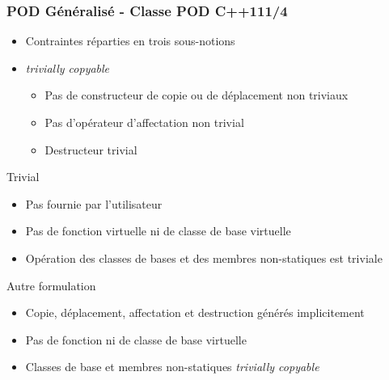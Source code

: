 \documentclass[C++.tex]{subfiles}
\begin{document}
\begin{frame}[fragile]
	\frametitle{POD Généralisé - Classe POD C++11\titlehfill{}1/4}
	\begin{itemize}
		\item Contraintes réparties en trois sous-notions
		\item \textit{trivially copyable}
		\begin{itemize}
			\item Pas de constructeur de copie ou de déplacement non triviaux
			\item Pas d'opérateur d'affectation non trivial
			\item Destructeur trivial
		\end{itemize}
	\end{itemize}

	\pause

	\begin{block}{Trivial}
		\begin{itemize}
			\item Pas fournie par l'utilisateur
			\item Pas de fonction virtuelle ni de classe de base virtuelle
			\item Opération des classes de bases et des membres non-statiques est triviale
		\end{itemize}
	\end{block}

	\pause

	\begin{block}{Autre formulation}
		\begin{itemize}
			\item Copie, déplacement, affectation et destruction générés implicitement
			\item Pas de fonction ni de classe de base virtuelle
			\item Classes de base et membres non-statiques \textit{trivially copyable}
		\end{itemize}
	\end{block}
\end{frame}
\end{document}
